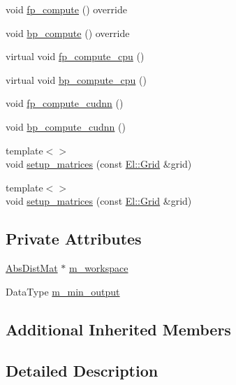\begin{DoxyCompactItemize}
\item 
void \hyperlink{classlbann_1_1softmax__layer_a15d05369ebef618edcf34d4679aaf2fc}{fp\+\_\+compute} () override
\item 
void \hyperlink{classlbann_1_1softmax__layer_a82e9fd693e34c6e8ebc77802940ad079}{bp\+\_\+compute} () override
\item 
virtual void \hyperlink{classlbann_1_1softmax__layer_ae781c249eccf05c670395cc94ad58bc4}{fp\+\_\+compute\+\_\+cpu} ()
\item 
virtual void \hyperlink{classlbann_1_1softmax__layer_ac9ba1f8425f6d59ed7f12b8b7fb5b7c0}{bp\+\_\+compute\+\_\+cpu} ()
\item 
void \hyperlink{classlbann_1_1softmax__layer_a5f2e55d32c4042e5da736b6eb5553e82}{fp\+\_\+compute\+\_\+cudnn} ()
\item 
void \hyperlink{classlbann_1_1softmax__layer_a507c8c53b4a1bc20b6e5b70ce05d7f67}{bp\+\_\+compute\+\_\+cudnn} ()
\item 
{\footnotesize template$<$$>$ }\\void \hyperlink{classlbann_1_1softmax__layer_ad011596d678ba62d3a92b0e9b2acae54}{setup\+\_\+matrices} (const \hyperlink{base_8hpp_a9951bb1719d534e0401b1f06cad19eab}{El\+::\+Grid} \&grid)
\item 
{\footnotesize template$<$$>$ }\\void \hyperlink{classlbann_1_1softmax__layer_ae9472c4f1d22ff51cb7508d17e37c61d}{setup\+\_\+matrices} (const \hyperlink{base_8hpp_a9951bb1719d534e0401b1f06cad19eab}{El\+::\+Grid} \&grid)
\end{DoxyCompactItemize}
\subsection*{Private Attributes}
\begin{DoxyCompactItemize}
\item 
\hyperlink{base_8hpp_a9a697a504ae84010e7439ffec862b470}{Abs\+Dist\+Mat} $\ast$ \hyperlink{classlbann_1_1softmax__layer_a604e614de25758f0072308c7efdd5bdb}{m\+\_\+workspace}
\item 
Data\+Type \hyperlink{classlbann_1_1softmax__layer_ab3bf2d92f4441923dd0b792c38ec774a}{m\+\_\+min\+\_\+output}
\end{DoxyCompactItemize}
\subsection*{Additional Inherited Members}


\subsection{Detailed Description}
